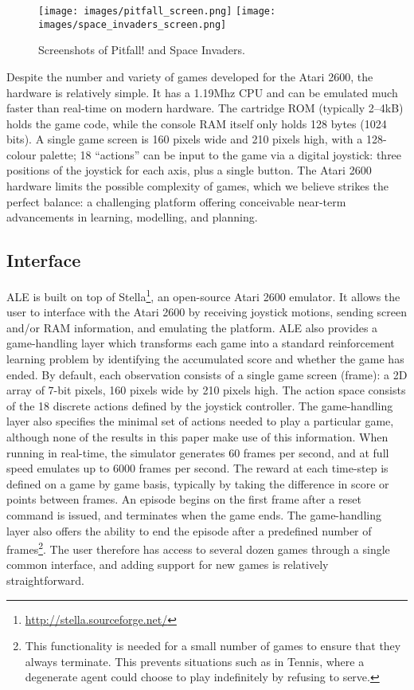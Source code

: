 \documentclass[twoside,11pt]{article}
\newcommand{\gamename}[1]{{\sc #1}}
\begin{document}
\begin{figure}[t!]
\begin{center}
\texttt{[image: images/pitfall\_screen.png]}
\texttt{[image: images/space\_invaders\_screen.png]}
\caption{Screenshots of \gamename{Pitfall!} and \gamename{Space Invaders}.\label{fig:atari_domain:screenshots}}
\end{center}
\vspace{-1.5em}
\end{figure}

Despite the number and variety of games developed for the Atari 2600, the hardware is relatively simple.  It has a 1.19Mhz CPU and can be emulated much faster than real-time on modern hardware.  The cartridge ROM (typically 2--4kB) holds the game code, while the console RAM itself only holds 128 bytes (1024 bits). A single game screen is 160 pixels wide and 210 pixels high, with a 128-colour palette; 18 ``actions'' can be input to the game via a digital joystick: three positions of the joystick for each axis, plus a single button.  The Atari 2600 hardware limits the possible complexity of games, which we believe strikes the perfect balance: a challenging platform offering conceivable near-term advancements in learning, modelling, and planning.

\subsection{Interface}
ALE is built on top of Stella\footnote{\url{http://stella.sourceforge.net/}}, an open-source Atari 2600 emulator. 
It allows the user to interface with the Atari 2600 by receiving joystick motions, sending screen and/or RAM information, and emulating the platform. 
ALE also provides a game-handling layer which transforms each game into a standard reinforcement learning problem by identifying the accumulated score and whether the game has ended. By default, each observation consists of a single game screen (frame): a 2D array of 7-bit pixels, 160 pixels wide by 210 pixels high. 
The action space consists of the 18 discrete actions defined by the joystick controller.  The game-handling layer also specifies the minimal set of actions needed to play a particular game, although none of the results in this paper make use of this information.
When running in real-time, the simulator generates 60 frames per second, and at full speed emulates up to 6000 frames per second.
The reward at each time-step is defined on a game by game basis, typically by taking the difference in score or points between frames. 
An episode begins on the first frame after a reset command is issued, and terminates when the game ends. 
The game-handling layer also offers the ability to end the episode after a predefined number of frames\footnote{This functionality is needed for a small number of games to ensure that they always terminate.
This prevents situations such as in \gamename{Tennis}, where a degenerate agent could choose to play indefinitely by refusing to serve.}.
The user therefore has access to several dozen games through a single common interface, and adding 
support for new games is relatively straightforward.
\end{document}
